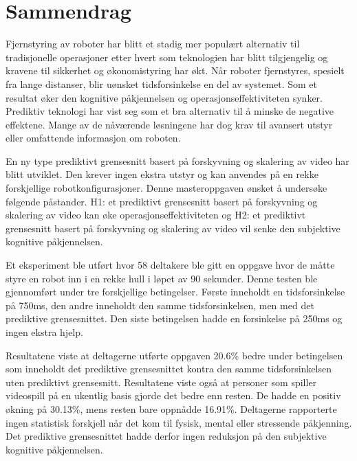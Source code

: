 \chapter*{Sammendrag}

Fjernstyring av roboter har blitt et stadig mer populært alternativ til tradisjonelle operasjoner etter hvert som teknologien har blitt tilgjengelig og kravene til sikkerhet og økonomistyring har økt. Når roboter fjernstyres, spesielt fra lange distanser, blir uønsket tidsforsinkelse en del av systemet. Som et resultat øker den kognitive påkjennelsen og operasjonseffektiviteten synker. Prediktiv teknologi har vist seg som et bra alternativ til å minske de negative effektene. Mange av de nåværende løsningene har dog krav til avansert utstyr eller omfattende informasjon om roboten.

En ny type prediktivt grensesnitt basert på forskyvning og skalering av video har blitt utviklet. Den krever ingen ekstra utstyr og kan anvendes på en rekke forskjellige robotkonfigurasjoner. Denne masteroppgaven ønsket å undersøke følgende påstander. H1: et prediktivt grensesnitt basert på forskyvning og skalering av video kan øke operasjonseffektiviteten og H2: et prediktivt grensesnitt basert på forskyvning og skalering av video vil senke den subjektive kognitive påkjennelsen.

Et eksperiment ble utført hvor 58 deltakere ble gitt en oppgave hvor de måtte styre en robot inn i en rekke hull i løpet av 90 sekunder. Denne testen ble gjennomført under tre forskjellige betingelser. Første inneholdt en tidsforsinkelse på 750ms, den andre inneholdt den samme tidsforsinkelsen, men med det prediktive grensesnittet. Den siste betingelsen hadde en forsinkelse på 250ms og ingen ekstra hjelp.

Resultatene viste at deltagerne utførte oppgaven 20.6\% bedre under betingelsen som inneholdt det prediktive grensesnittet kontra den samme tidsforsinkelsen uten prediktivt grensesnitt. Resultatene viste også at personer som spiller videospill på en ukentlig basis gjorde det bedre enn resten. De hadde en positiv økning på 30.13\%, mens resten bare oppnådde 16.91\%. Deltagerne rapporterte ingen statistisk forskjell når det kom til fysisk, mental eller stressende påkjenning. Det prediktive grensesnittet hadde derfor ingen reduksjon på den subjektive kognitive påkjennelsen.
